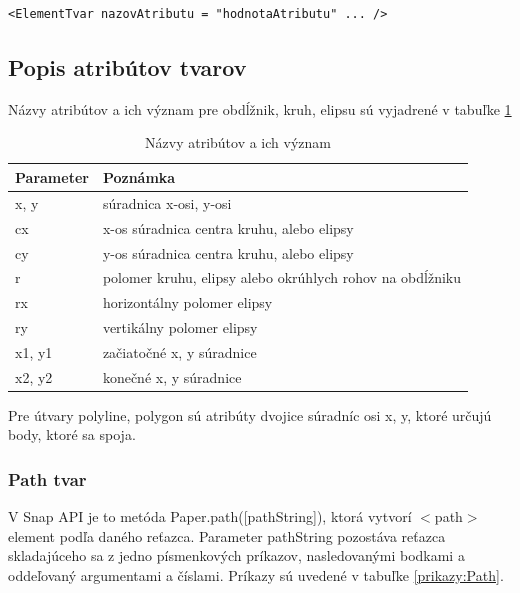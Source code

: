 \begin{lstlisting}
<ElementTvar nazovAtributu = "hodnotaAtributu" ... />
\end{lstlisting}

\subsection{Popis atribútov tvarov}

Názvy atribútov a ich význam pre obdĺžnik, kruh, elipsu sú vyjadrené v tabuľke \ref{parametre:tvar} 

\begin{table}[H]
	\begin{center}
		\begin{tabular}{|l|l|}
			\hline \textbf{Parameter} & \textbf{Poznámka} \\ 
			\hline
			\hline x, y & súradnica x-osi, y-osi  \\ 
			\hline cx & x-os súradnica centra kruhu, alebo elipsy \\ 
			\hline cy & y-os súradnica centra kruhu, alebo elipsy \\ 
			\hline r & polomer kruhu, elipsy alebo okrúhlych rohov na obdĺžniku\\ 
			\hline rx & horizontálny polomer elipsy \\ 
			\hline ry & vertikálny polomer elipsy \\ 
			\hline x1, y1 & začiatočné x, y súradnice \\
			\hline x2, y2 & konečné x, y súradnice \\
			\hline
		\end{tabular} 
		
	\end{center}
	\caption{Názvy atribútov a ich význam}
	\label{parametre:tvar}
\end{table}

Pre útvary polyline, polygon sú atribúty dvojice súradníc osi x, y, ktoré určujú body, ktoré sa spoja. 



\subsubsection{Path tvar}


V Snap API je to metóda Paper.path([pathString]), ktorá vytvorí $<$path$>$ element podľa daného reťazca.  Parameter pathString pozostáva reťazca skladajúceho sa z jedno písmenkových príkazov, nasledovanými bodkami a oddeľovaný argumentami a číslami. Príkazy sú uvedené v tabuľke \ref{prikazy:Path}.


